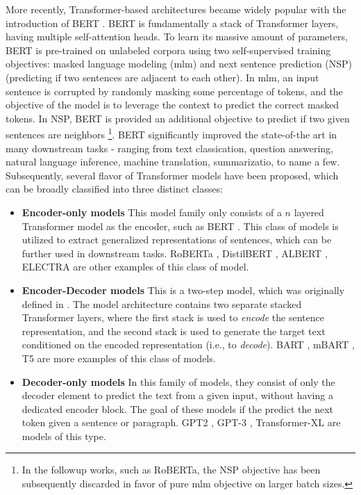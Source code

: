 \documentclass[letterpaper, 12pt]{report}
\begin{document}
More recently, Transformer-based architectures became widely popular with the introduction of BERT \citep{devlin-etal-2019-bert}. BERT is fundamentally a stack of Transformer layers, having multiple self-attention heads. To learn its massive amount of parameters, BERT is pre-trained on unlabeled corpora using two self-supervised training objectives: masked language modeling (\acrshort{mlm}) and next sentence prediction (NSP) (predicting if two sentences are adjacent to each other). In \acrshort{mlm}, an input sentence is corrupted by randomly masking some percentage of tokens, and the objective of the model is to leverage the context to predict the correct masked tokens. In NSP, BERT is provided an additional objective to predict if two given sentences are neighbors \footnote{In the followup works, such as RoBERTa, the NSP objective has been subsequently discarded in favor of pure \acrshort{mlm} objective on larger batch sizes.}. BERT significantly improved the state-of-the art in many downstream tasks - ranging from text classication, question answering, natural language inference, machine translation, summarizatio, to name a few. Subsequently, several flavor of Transformer models have been proposed, which can be broadly classified into three distinct classes:

\begin{itemize}
  \item \textbf{Encoder-only models} This model family only consists of a $n$ layered Transformer model as the encoder, such as BERT \citep{devlin-etal-2019-bert}. This class of models is utilized to extract generalized representations of sentences, which can be further used in downstream tasks. RoBERTa \citep{liu-et-al-2019-roberta}, DistilBERT \citep{sanh2020distilbert}, ALBERT \citep{lan2019albert}, ELECTRA \citep{clark2020electra} are other examples of this class of model.
  \item \textbf{Encoder-Decoder models} This is a two-step model, which was originally defined in \cite{vaswani-etal-2017-attention}. The model architecture contains two separate stacked Transformer layers, where the first stack is used to \textit{encode} the sentence representation, and the second stack is used to generate the target text conditioned on the encoded representation (i.e., to \textit{decode}). BART \citep{lewis-etal-2020-bart}, mBART \citep{liu2020multilingual}, T5 \citep{Raffel2020:T5} are more examples of this class of models.
  \item \textbf{Decoder-only models} In this family of models, they consist of only the decoder element to predict the text from a given input, without having a dedicated encoder block. The goal of these models if the predict the next token given a sentence or paragraph. GPT2 \citep{Radford2019:GPT2}, GPT-3 \citep{Brown2020:GPT3}, Transformer-XL \cite{dai-etal-2019-transformer} are models of this type.
\end{itemize}
\end{document}
